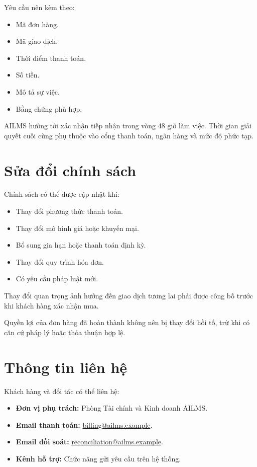 \documentclass[12pt,a4paper]{article}
\begin{document}
Yêu cầu nên kèm theo:

\begin{itemize}
    \item Mã đơn hàng.
    \item Mã giao dịch.
    \item Thời điểm thanh toán.
    \item Số tiền.
    \item Mô tả sự việc.
    \item Bằng chứng phù hợp.
\end{itemize}

AILMS hướng tới xác nhận tiếp nhận trong vòng 48 giờ làm việc.
Thời gian giải quyết cuối cùng phụ thuộc vào cổng thanh toán,
ngân hàng và mức độ phức tạp.

\section{Sửa đổi chính sách}

Chính sách có thể được cập nhật khi:

\begin{itemize}
    \item Thay đổi phương thức thanh toán.
    \item Thay đổi mô hình giá hoặc khuyến mại.
    \item Bổ sung gia hạn hoặc thanh toán định kỳ.
    \item Thay đổi quy trình hóa đơn.
    \item Có yêu cầu pháp luật mới.
\end{itemize}

Thay đổi quan trọng ảnh hưởng đến giao dịch tương lai
phải được công bố trước khi khách hàng xác nhận mua.

Quyền lợi của đơn hàng đã hoàn thành không nên bị thay đổi hồi tố,
trừ khi có căn cứ pháp lý hoặc thỏa thuận hợp lệ.

\section{Thông tin liên hệ}

Khách hàng và đối tác có thể liên hệ:

\begin{itemize}
    \item \textbf{Đơn vị phụ trách:}
    Phòng Tài chính và Kinh doanh AILMS.

    \item \textbf{Email thanh toán:}
    \href{mailto:billing@ailms.example}{billing@ailms.example}.

    \item \textbf{Email đối soát:}
    \href{mailto:reconciliation@ailms.example}
    {reconciliation@ailms.example}.

    \item \textbf{Kênh hỗ trợ:}
    Chức năng gửi yêu cầu trên hệ thống.
\end{itemize}
\end{document}
